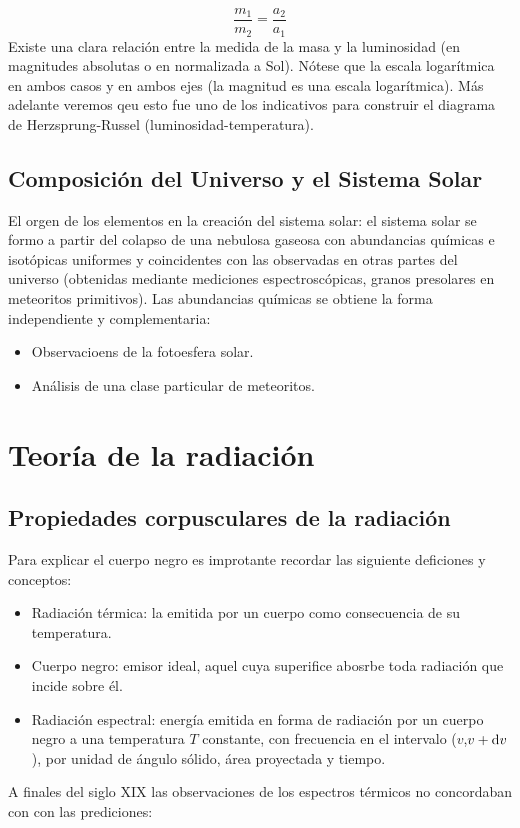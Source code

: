 \begin{equation*}
	\frac{m_1}{m_2} = \frac{a_2}{a_1}
\end{equation*}
Existe una clara relación entre la medida de la masa y la luminosidad (en magnitudes absolutas o en normalizada a Sol). Nótese que la escala logarítmica en ambos casos y en ambos ejes (la magnitud es una escala logarítmica). Más adelante veremos qeu esto fue uno de los indicativos para construir el diagrama de Herzsprung-Russel (luminosidad-temperatura).

\subsection{Composición del Universo y el Sistema Solar}

El orgen de los elementos en la creación del sistema solar: el sistema solar se formo a partir del colapso de una nebulosa gaseosa con abundancias químicas e isotópicas uniformes y coincidentes con las observadas en otras partes del universo (obtenidas mediante mediciones espectroscópicas, granos presolares en meteoritos primitivos). Las abundancias químicas se obtiene la forma independiente y complementaria:

\begin{itemize}
	\item Observacioens de la fotoesfera solar.
	\item Análisis de una clase particular de meteoritos.
\end{itemize}





\section{Teoría de la radiación}

\subsection{Propiedades corpusculares de la radiación}

Para explicar el cuerpo negro es improtante recordar las siguiente deficiones y conceptos:

\begin{itemize}
	\item Radiación térmica: la emitida por un cuerpo como consecuencia de su temperatura.
	\item Cuerpo negro: emisor ideal, aquel cuya superifice abosrbe toda radiación que incide sobre él.
	\item Radiación espectral: energía emitida en forma de radiación por un cuerpo negro a una temperatura $T$ constante, con frecuencia en el intervalo ($v$,$v+\mathrm{d} v$), por unidad de ángulo sólido, área proyectada y tiempo.
\end{itemize}
A finales del siglo XIX las observaciones de los espectros térmicos no concordaban con con las prediciones:

